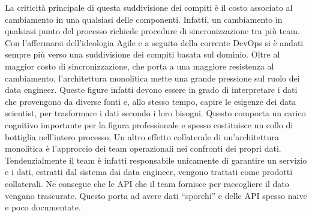 \documentclass[12pt]{report}
\begin{document}
La criticità principale di questa suddivisione dei compiti è il costo associato al cambiamento in una qualsiasi delle componenti. 
Infatti, un cambiamento in qualsiasi punto del processo richiede procedure di sincronizzazione tra più team.
Con l'affermarsi dell'ideologia Agile \cite{fowler2001agile} e a seguito della corrente DevOps si è andati sempre più verso una suddivisione dei compiti basata sul dominio. 
Oltre al maggior costo di sincronizzazione, che porta a una maggiore resistenza al cambiamento, l'architettura monolitica mette una grande pressione sul ruolo dei data engineer.
Queste figure infatti devono essere in grado di interpretare i dati che provengono da diverse fonti e, allo stesso tempo, capire le esigenze dei data scientist, per trasformare i dati secondo i loro bisogni. 
Questo comporta un carico cognitivo importante per la figura professionale e spesso costituisce un collo di bottiglia nell'intero processo.
Un altro effetto collaterale di un'architettura monolitica è l'approccio dei team operazionali nei confronti dei propri dati.  
Tendenzialmente il team è infatti responsabile unicamente di garantire un servizio e i dati, estratti dal sistema dai data engineer, vengono trattati come prodotti collaterali. 
Ne consegue che le API che il team fornisce per raccogliere il dato vengano trascurate. 
Questo porta ad avere dati ``sporchi'' e delle API spesso naive e poco documentate.
\end{document}
